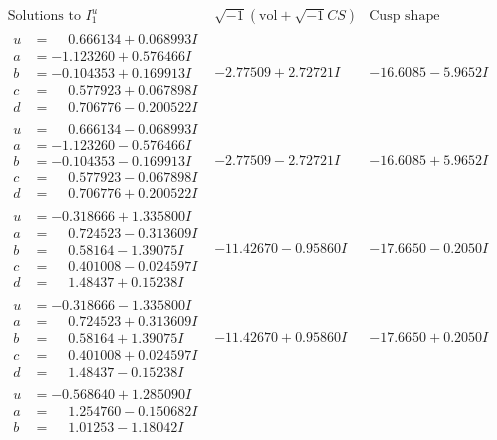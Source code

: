 \documentclass[1p]{elsarticle_modified}
\theoremstyle{definition}
\newcommand{\I}{\sqrt{-1}}
\begin{document}
$$\begin{array}{c|c|c}
\text{Solutions to }I^u_{1}& \I (\text{vol} + \sqrt{-1}CS) & \text{Cusp shape}\\
 \hline 
\begin{aligned}
u &= \phantom{-}0.666134 + 0.068993 I \\
a &= -1.123260 + 0.576466 I \\
b &= -0.104353 + 0.169913 I \\
c &= \phantom{-}0.577923 + 0.067898 I \\
d &= \phantom{-}0.706776 - 0.200522 I\end{aligned}
 & -2.77509 + 2.72721 I & -16.6085 - 5.9652 I \\ \hline\begin{aligned}
u &= \phantom{-}0.666134 - 0.068993 I \\
a &= -1.123260 - 0.576466 I \\
b &= -0.104353 - 0.169913 I \\
c &= \phantom{-}0.577923 - 0.067898 I \\
d &= \phantom{-}0.706776 + 0.200522 I\end{aligned}
 & -2.77509 - 2.72721 I & -16.6085 + 5.9652 I \\ \hline\begin{aligned}
u &= -0.318666 + 1.335800 I \\
a &= \phantom{-}0.724523 - 0.313609 I \\
b &= \phantom{-}0.58164 - 1.39075 I \\
c &= \phantom{-}0.401008 - 0.024597 I \\
d &= \phantom{-}1.48437 + 0.15238 I\end{aligned}
 & -11.42670 - 0.95860 I & -17.6650 - 0.2050 I \\ \hline\begin{aligned}
u &= -0.318666 - 1.335800 I \\
a &= \phantom{-}0.724523 + 0.313609 I \\
b &= \phantom{-}0.58164 + 1.39075 I \\
c &= \phantom{-}0.401008 + 0.024597 I \\
d &= \phantom{-}1.48437 - 0.15238 I\end{aligned}
 & -11.42670 + 0.95860 I & -17.6650 + 0.2050 I \\ \hline\begin{aligned}
u &= -0.568640 + 1.285090 I \\
a &= \phantom{-}1.254760 - 0.150682 I \\
b &= \phantom{-}1.01253 - 1.18042 I \\

\end{aligned}
\end{array}$$
\end{document}
